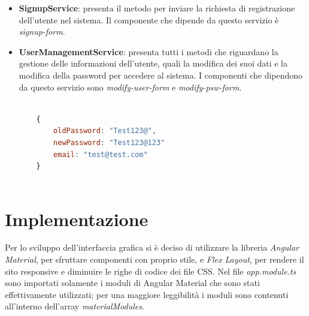 \documentclass[11pt]{article}
\begin{document}
\begin{itemize}
    \begin{lstlisting}[language=JavaScript, numbers=none, caption=Esempio di JSON utilizzato per le opere]
    
    //opera informations
    {
        id:"Qmb13ALEkqXtV5DT6jcrXuUGjat",
        title: "test",
        description: "test",
        authorId: 18,
        price: 52.0,
        currency: "ETH",
        status: false,
        path: "gallery/Qmb13ALEkqXtV5DT6jcrXuUGjat.jpg",
        type: "img",
        owner: "test",
        author: "test",
        categories: [{id: 2, name:"sport"}]
    }
    
    \end{lstlisting}
    
    \item \textbf{SignupService}: presenta il metodo per inviare la richiesta di registrazione dell'utente nel sistema. Il componente che dipende da questo servizio è \textit{signup-form}.
    
    \item \textbf{UserManagementService}: presenta tutti i metodi che riguardano la gestione delle informazioni dell'utente, quali la modifica dei suoi dati e la modifica della password per accedere al sistema. I componenti che dipendono da questo servizio sono \textit{modify-user-form} e \textit{modify-psw-form}.
    
    \begin{lstlisting}[language=JavaScript, numbers=none, caption=Esempio di JSON utilizzato per la richiesta di modifica password]

    {
        oldPassword: "Test123@",
        newPassword: "Test123@123"
        email: "test@test.com"
    }
    
    \end{lstlisting}
    
\end{itemize}


\section{Implementazione}
Per lo sviluppo dell'interfaccia grafica si è deciso di utilizzare la libreria \textit{Angular Material}, per sfruttare componenti con proprio stile, e \textit{Flex Layout}, per rendere il sito responsive e diminuire le righe di codice dei file CSS. Nel file \textit{app.module.ts} sono importati solamente i moduli di Angular Material che sono stati effettivamente utilizzati; per una maggiore leggibilità i moduli sono contenuti all'interno dell'array \textit{materialModules}.
\end{document}
